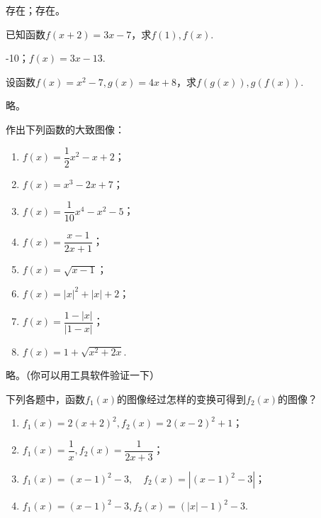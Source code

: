 \documentclass[lang=cn,newtx,10pt,scheme=chinese]{elegantbook}
\begin{document}
\begin{solution}
  存在；存在。
\end{solution}

\begin{exercise}\label{2017RJB.P94.8.changed}
  已知函数$f(x+2)=3x-7$，求$f(1),f(x)$.
\end{exercise}

\begin{solution}
  -10；$f(x)=3x-13$.
\end{solution}

\begin{exercise}
  设函数$f(x)=x^2-7,g(x)=4x+8$，求$f(g(x)),g(f(x))$.
\end{exercise}

\begin{solution}
  略。
\end{solution}

\begin{exercise}
  作出下列函数的大致图像：
\end{exercise}

\begin{spacing}{1.8}
  \begin{enumerate}
    \item $f(x)=\dfrac12 x^2-x+2$；
    \item $f(x)=x^3-2x+7$；
    \item $f(x)=\dfrac{1}{10}x^4-x^2-5$；
    \item $f(x)=\dfrac{x-1}{2x+1}$；
    \item $f(x)=\sqrt{x-1}$；
    \item $f(x)=\left|x\right|^2+\left|x\right|+2$；
    \item $f(x)=\dfrac{1-\left|x\right|}{\left|1-x\right|}$；
    \item $f(x)=1+\sqrt{x^{2}+2x}$.
  \end{enumerate}
\end{spacing}

\begin{solution}
  略。（你可以用工具软件验证一下）
\end{solution}

\begin{exercise}\label{BJSZ.Algebra1.P58-59.changed}
  下列各题中，函数$f_1(x)$的图像经过怎样的变换可得到$f_2(x)$的图像？
\end{exercise}

\begin{spacing}{1.7}
  \begin{enumerate}
    \item $f_{1}(x)=2(x+2)^{2}, f_{2}(x)=2(x-2)^{2}+1$；
    \item $f_{1}(x)=\dfrac{1}{x}, f_{2}(x)=\dfrac{1}{2x+3}$；
    \item $f_{1}\left(x\right)=\left(x-1\right)^{2}-3,\quad f_{2}\left(x\right)=\left|\left(x-1\right)^{2}-3\right|$；
    \item $f_{1}(x)=(x-1)^{2}-3,f_{2}(x)=(|x|-1)^{2}-3$.
  \end{enumerate}
\end{spacing}
\end{document}
